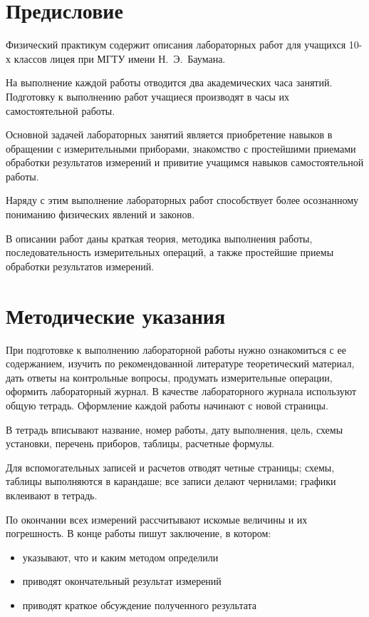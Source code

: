 \documentclass[a4paper, 12pt]{extarticle}
\begin{document}
\MTDTitlePage
\MTDInfoPage


\section*{Предисловие}
Физический практикум содержит описания лабораторных работ для учащихся 10-х классов лицея  при МГТУ имени Н.~Э.~Баумана.

На выполнение каждой работы отводится два академических часа занятий. Подготовку к выполнению работ учащиеся производят в часы их самостоятельной работы.

Основной задачей лабораторных занятий является приобретение навыков в обращении с измерительными приборами, знакомство с простейшими приемами обработки результатов измерений и привитие учащимся навыков самостоятельной работы.

Наряду с этим выполнение лабораторных работ способствует более осознанному пониманию физических явлений и законов.

В описании работ даны краткая теория, методика выполнения работы, последовательность измерительных операций, а также простейшие приемы обработки результатов измерений.

\section*{Методические указания}
При подготовке к выполнению лабораторной работы нужно ознакомиться с ее содержанием, изучить по рекомендованной литературе теоретический материал, дать ответы на контрольные вопросы, продумать измерительные операции, оформить лабораторный журнал. В качестве лабораторного журнала используют общую тетрадь. Оформление каждой работы начинают с новой страницы.

В тетрадь вписывают название, номер работы, дату выполнения, цель, схемы установки, перечень приборов, таблицы, расчетные формулы.

Для вспомогательных записей и расчетов отводят четные страницы; схемы, таблицы выполняются в карандаше; все записи делают чернилами; графики вклеивают в тетрадь.

По окончании всех измерений рассчитывают искомые величины и их погрешность. В конце работы пишут заключение, в котором:

\begin{itemize}
  \item указывают, что и каким методом определили
  \item приводят окончательный результат измерений
  \item приводят краткое обсуждение полученного результата
\end{itemize}
\end{document}
